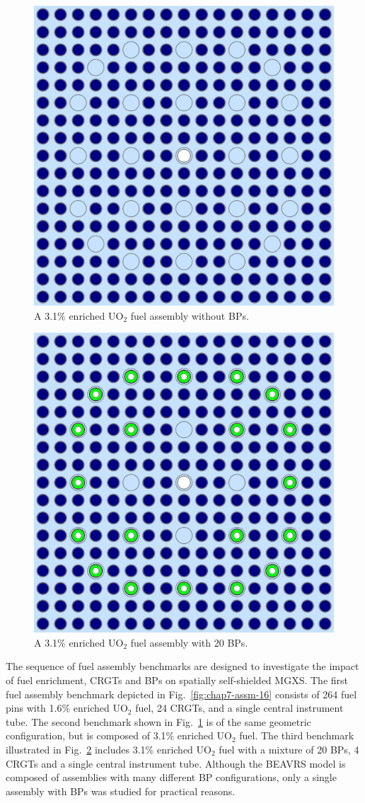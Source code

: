 \begin{figure}[h!]
  \centering
  \includegraphics[width=0.65\linewidth]{figures/benchmarks/assembly-31}
\vspace{2mm}
\caption[BEAVRS 3.1\% enriched assembly]{A 3.1\% enriched UO$_2$ fuel assembly without \acp{BP}.}
\label{fig:chap7-assm-31}
\end{figure}

\begin{figure}[h!]
  \centering
  \includegraphics[width=0.65\linewidth]{figures/benchmarks/assembly-31-20BPs}
\vspace{2mm}
\caption[BEAVRS 3.1\% enriched assembly with 20 BPs]{A 3.1\% enriched UO$_2$ fuel assembly with 20 \acp{BP}.}
\label{fig:chap7-assm-31-20BPs}
\end{figure}

The sequence of fuel assembly benchmarks are designed to investigate the impact of fuel enrichment, \acp{CRGT} and \acp{BP} on spatially self-shielded \ac{MGXS}. The first fuel assembly benchmark depicted in Fig.~\ref{fig:chap7-assm-16} consists of 264 fuel pins with 1.6\% enriched UO$_2$ fuel, 24 \acp{CRGT}, and a single central instrument tube. The second benchmark shown in Fig.~\ref{fig:chap7-assm-31} is of the same geometric configuration, but is composed of 3.1\% enriched UO$_2$ fuel. The third benchmark illustrated in Fig.~\ref{fig:chap7-assm-31-20BPs} includes 3.1\% enriched UO$_2$ fuel with a mixture of 20 \acp{BP}, 4 \acp{CRGT} and a single central instrument tube. Although the \ac{BEAVRS} model is composed of assemblies with many different \ac{BP} configurations, only a single assembly with \acp{BP} was studied for practical reasons.


